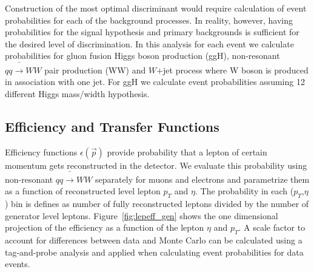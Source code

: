 \documentclass{cmspaper}
\begin{document}
Construction of the most optimal discriminant would require calculation 
of event probabilities for each of the background processes. In reality, however, having 
probabilities for the signal hypothesis and primary backgrounds is sufficient for the 
desired level of discrimination. In this analysis for each event we calculate probabilities 
for gluon fusion Higgs boson production (ggH), non-resonant $qq\bar\rightarrow WW$ pair 
production (WW) and $W$+jet process where W boson is produced in association with one jet. 
For ggH we calculate event probabilities assuming 12 different Higgs mass/width
hypothesis.
                                        
\subsection{Efficiency and Transfer Functions}

Efficiency functions $\epsilon(\vec{p})$ provide probability that a lepton of certain momentum
gets reconstructed in the detector. We evaluate this probability using non-resonant $qq\bar\rightarrow WW$
separately for muons and electrons and parametrize them as a function of reconstructed level lepton $p_{T}$ and $\eta$.
The probability in each ($p_{T}$,$\eta$) bin is defines as number of fully reconstructed leptons divided 
by the number of generator level leptons. Figure~\ref{fig:lepeff_gen} shows the 
one dimensional projection of the efficiency as a function of the lepton $\eta$ and $p_{T}$. 
A scale factor to account for differences between 
data and Monte Carlo can be calculated using a tag-and-probe analysis and applied when calculating event 
probabilities for data events.
\end{document}

